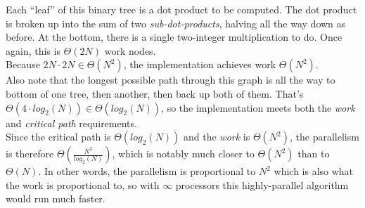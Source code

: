 \documentclass[11pt, letterpaper]{article}
\begin{document}
Each ``leaf'' of this binary tree is a dot product to be computed. The dot product is broken up into the sum of two \textit{sub-dot-products}, halving all the way down as before. At the bottom, there is a single two-integer multiplication to do. Once again, this is $\Theta(2N)$ work nodes.\\

Because $2N \cdot 2N \in \Theta(N^2)$, the implementation achieves work $\Theta(N^2)$.\\

Also note that the longest possible path through this graph is all the way to bottom of one tree, then another, then back up both of them. That's $\Theta(4 \cdot log_2(N)) \in \Theta(log_2(N))$, so the implementation meets both the \textit{work} and \textit{critical path} requirements.\\

Since the critical path is $\Theta(log_2(N))$ and the \textit{work} is $\Theta(N^2)$, the parallelism is therefore $\Theta(\frac{N^2}{log_2(N)})$, which is notably much closer to $\Theta(N^2)$ than to $\Theta(N)$. In other words, the parallelism is proportional to $N^2$ which is also what the work is proportional to, so with $\infty$ processors this highly-parallel algorithm would run much faster.
\end{document}
